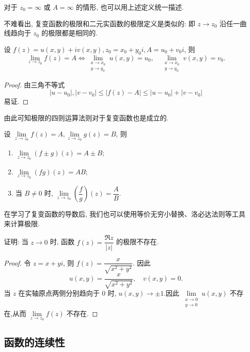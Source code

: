 对于 $z_0=\infty$ 或 $A=\infty$ 的情形, 也可以用上述定义统一描述.

不难看出, 复变函数的极限和二元实函数的极限定义是类似的:
即 $z\to z_0$ 沿任一曲线趋向于 $z_0$ 的极限都是相同的.

\begin{theorem}[函数极限的等价刻画]
  设 $f(z)=u(x,y)+iv(x,y),z_0=x_0+y_0i,A=u_0+v_0i$, 则
  \[\lim_{z\to z_0}f(z)=A\iff
  \lim_{\substack{x\to x_0\\y\to y_0}}u(x,y)=u_0,\quad
  \lim_{\substack{x\to x_0\\y\to y_0}}v(x,y)=v_0.\]
\end{theorem}

\begin{proof}
  由三角不等式
  \[|u-u_0|,|v-v_0|\le|f(z)-A|\le|u-u_0|+|v-v_0|\]
  易证.
\end{proof}

由此可知极限的四则运算法则对于复变函数也是成立的.

\begin{theorem}[函数极限的四则运算法则]
  设 $\lim\limits_{z\to z_0}f(z)=A,\lim\limits_{z\to z_0}g(z)=B$, 则
  \begin{enumerate}
    \item $\lim\limits_{z\to z_0}(f\pm g)(z)=A\pm B$;
    \item $\lim\limits_{z\to z_0}(fg)(z)=AB$;
    \item 当 $B\neq 0$ 时, $\lim\limits_{z\to z_0}\left(\dfrac fg\right)(z)=\dfrac AB$.
  \end{enumerate}
\end{theorem}

在学习了复变函数的导数后, 我们也可以使用等价无穷小替换、洛必达法则等工具来计算极限.

\begin{example}
  证明: 当 $z\to0$ 时, 函数 $f(z)=\dfrac{\Re z}{|z|}$ 的极限不存在.
\end{example}

\begin{proof}
  令 $z=x+yi$, 则 $f(z)=\dfrac x{\sqrt{x^2+y^2}}$.
  因此
    \[u(x,y)=\frac x{\sqrt{x^2+y^2}},\quad v(x,y)=0.\]
  当 $z$ 在实轴原点两侧分别趋向于 $0$ 时, $u(x,y)\to\pm1$.因此 $\lim\limits_{\substack{x\to 0\\y\to0}}u(x,y)$ 不存在,从而 $\lim\limits_{z\to z_0}f(z)$ 不存在.
\end{proof}


\subsection{函数的连续性}

